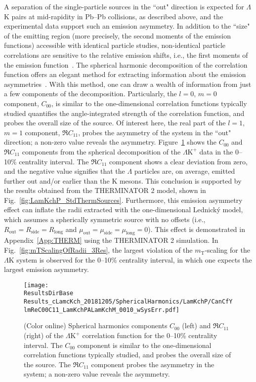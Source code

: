 \documentclass[ALICE,manyauthors]{cernphprep}
\newcommand{\ResultsDirBase}{/home/jesse/Analysis/FemtoAnalysis/Results/}
\newcommand{\mt}{$m_{\mathrm{T}}$\xspace}
\newcommand{\Lam}{$\Lambda$\xspace}
\newcommand{\LamK}{$\Lambda$K\xspace}
\newcommand{\LamKchP}{$\Lambda\mathrm{K^{+}}$\xspace}
\begin{document}
A separation of the single-particle sources in the ``out" direction is expected for \LamK pairs at mid-rapidity in Pb--Pb collisions, as described above, and the experimental data support such an emission asymmetry.
In addition to the ``size" of the emitting region (more precisely, the second moments of the emission functions) accessible with identical particle studies, non-identical particle correlations are sensitive to the relative emission shifts, i.e., the first moments of the emission function~\cite{Kisiel:2009eh}.
The spherical harmonic decomposition of the correlation function offers an elegant method for extracting information about the emission asymmetries~\cite{Chajecki:2008vg, PhysRevC.72.054902, Kisiel:2009iw}.
With this method, one can draw a wealth of information from just a few components of the decomposition.
Particularly, the $l=0$, $m=0$ component, $C_{00}$, {\color{red}is similar to the one-dimensional correlation functions typically studied} {\color{blue}quantifies the angle-integrated strength of the correlation function}, and probes the overall size of the source.
Of interest here, the real part of the $l=1$, $m=1$ component, $\Re C_{11}$, probes the asymmetry of the system in the ``out" direction; a non-zero value reveals the asymmetry. 
Figure~\ref{fig:LamKchP_ReC00C11_0010} shows the $C_{00}$ and $\Re C_{11}$ components from the spherical decomposition of the \LamKchP data in the 0--10\% centrality interval.
The $\Re C_{11}$ component shows a clear deviation from zero, and the negative value signifies that the \Lam particles are, on average, emitted further out and/or earlier than the K mesons.
This conclusion is supported by the results obtained from the THERMINATOR 2 model, shown in Fig.~\ref{fig:LamKchP_StdThermSources}.
Furthermore, this emission asymmetry effect can inflate the radii extracted with the one-dimensional Lednick\'y model, which assumes a spherically symmetric source with no offsets (i.e., $R_{\mathrm{out}} = R_{\mathrm{side}} = R_{\mathrm{long}}$ and $\mu_{\mathrm{out}} = \mu_{\mathrm{side}} = \mu_{\mathrm{long}} = 0$).
This effect is demonstrated in Appendix~\ref{App:THERM} using the THERMINATOR 2 simulation.
In Fig.~\ref{fig:mTScalingOfRadii_3Res}, the largest violation of the \mt-scaling for the \LamK system is observed for the 0--10\% centrality interval, in which one expects the largest emission asymmetry.

\begin{figure}[h!]
  \centering
  \texttt{[image: \\ResultsDirBase Results\_cLamcKch\_20181205/SphericalHarmonics/LamKchP/CanCfYlmReC00C11\_LamKchPALamKchM\_0010\_wSysErr.pdf]}
  \caption[\LamKchP $C_{00}$ and $\Re C_{11}$ Spherical Harmonic Components (0--10\%)]
  {
  (Color online) Spherical harmonics components $C_{00}$ (left) and $\Re C_{11}$ (right) of the \LamKchP correlation function for the 0--10\% centrality interval.  
The $C_{00}$ component is similar to the one-dimensional correlation functions typically studied, and probes the overall size of the source.
The $\Re C_{11}$ component probes the asymmetry in the system; a non-zero value reveals the asymmetry.
  }
  \label{fig:LamKchP_ReC00C11_0010}
\end{figure}
\end{document}
